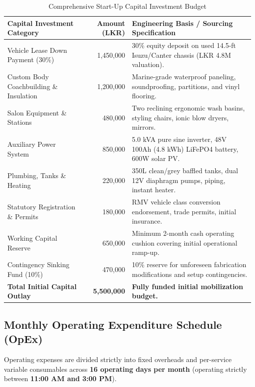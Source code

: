 \begin{table}[htbp]
\centering
\small
\caption{Comprehensive Start-Up Capital Investment Budget}
\label{tab:sec7_capex}
\begin{tabularx}{\textwidth}{L{0.44\textwidth}rY}
\toprule
\textbf{Capital Investment Category} & \textbf{Amount (LKR)} & \textbf{Engineering Basis / Sourcing Specification} \\
\midrule
Vehicle Lease Down Payment (30\%) & 1,450,000 & 30\% equity deposit on used 14.5-ft Isuzu/Canter chassis (LKR 4.8M valuation). \\
Custom Body Coachbuilding \& Insulation & 1,200,000 & Marine-grade waterproof paneling, soundproofing, partitions, and vinyl flooring. \\
Salon Equipment \& Stations & 480,000 & Two reclining ergonomic wash basins, styling chairs, ionic blow dryers, mirrors. \\
Auxiliary Power System & 850,000 & 5.0 kVA pure sine inverter, 48V 100Ah (4.8 kWh) LiFePO4 battery, 600W solar PV. \\
Plumbing, Tanks \& Heating & 220,000 & 350L clean/grey baffled tanks, dual 12V diaphragm pumps, piping, instant heater. \\
Statutory Registration \& Permits & 180,000 & RMV vehicle class conversion endorsement, trade permits, initial insurance. \\
Working Capital Reserve & 650,000 & Minimum 2-month cash operating cushion covering initial operational ramp-up. \\
Contingency Sinking Fund (10\%) & 470,000 & 10\% reserve for unforeseen fabrication modifications and setup contingencies. \\
\midrule
\textbf{Total Initial Capital Outlay} & \textbf{5,500,000} & \textbf{Fully funded initial mobilization budget.} \\
\bottomrule
\end{tabularx}
\end{table}

\subsection{Monthly Operating Expenditure Schedule (OpEx)}
\label{subsec:monthly_opex}

Operating expenses are divided strictly into fixed overheads and per-service variable consumables across \textbf{16 operating days per month} (operating strictly between \textbf{11:00 AM and 3:00 PM}).

